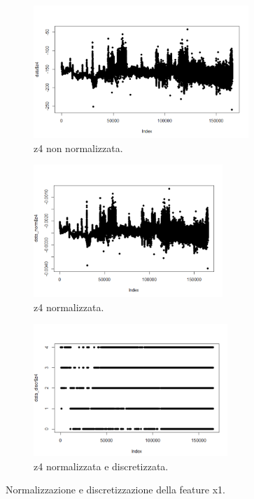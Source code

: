 \documentclass[12pt]{article}
\begin{document}
\begin{figure}[h]
	
	\begin{subfigure}{0.5\textwidth}
		\includegraphics[width=0.9\linewidth, height=5cm]{images/z4notnormalize.PNG} 
		\caption{z4 non normalizzata.}
		\label{x1nonNormalize}
	\end{subfigure}
	\begin{subfigure}{0.5\textwidth}
		\includegraphics[width=0.9\linewidth, height=5cm]{images/z4normalize.PNG}
		\caption{z4 normalizzata.}
		\label{subim2}
	\end{subfigure}
	\begin{subfigure}{0.5\textwidth}
		\includegraphics[width=0.9\linewidth, height=5cm]{images/z4discretize.PNG}
		\caption{z4 normalizzata e discretizzata.}
		\label{subim2}
	\end{subfigure}
	\caption{Normalizzazione e discretizzazione della feature x1.}
	\label{z4}
\end{figure}
\end{document}
